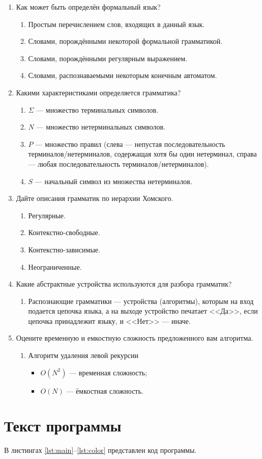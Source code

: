\documentclass[a4paper]{bmstu}
\begin{document}
\begin{enumerate}
    \item Как может быть определён формальный язык?
    \begin{enumerate}
        \item Простым перечислением слов, входящих в данный язык.
        \item Словами, порождёнными некоторой формальной грамматикой.
        \item Словами, порождёнными регулярным выражением.
        \item Словами, распознаваемыми некоторым конечным автоматом.
    \end{enumerate}
    \item Какими характеристиками определяется грамматика?
    \begin{enumerate}
        \item $\Sigma$ --- множество терминальных символов.
        \item $N$ --- множество нетерминальных символов.
        \item $P$ --- множество правил (слева --- непустая последовательность терминалов/нетерминалов, содержащая хотя бы один нетерминал, справа --- любая последовательность терминалов/нетерминалов).
        \item $S$ --- начальный символ из множества нетерминалов.
    \end{enumerate}
    \item Дайте описания грамматик по иерархии Хомского.
    \begin{enumerate}
        \item Регулярные.
        \item Контекстно-свободные.
        \item Контекстно-зависимые.
        \item Неограниченные.
    \end{enumerate}
    \item Какие абстрактные устройства используются для разбора грамматик?
    \begin{enumerate}
        \item Распознающие грамматики --- устройства (алгоритмы), которым на вход подается цепочка языка, а на выходе устройство печатает <<Да>>, если цепочка принадлежит языку, и <<Нет>> --- иначе.
    \end{enumerate}
    \item Оцените временную и емкостную сложность предложенного вам алгоритма.
    \begin{enumerate}
        \item Алгоритм удаления левой рекурсии
        \begin{itemize}
            \item $O(N^2)$ --- временная сложность;
            \item $O(N)$ --- ёмкостная сложность.
        \end{itemize}
    \end{enumerate}
\end{enumerate}


\chapter{Текст программы}

В листингах \ref{lst:main}--\ref{lst:color} представлен код программы.


\end{document}
